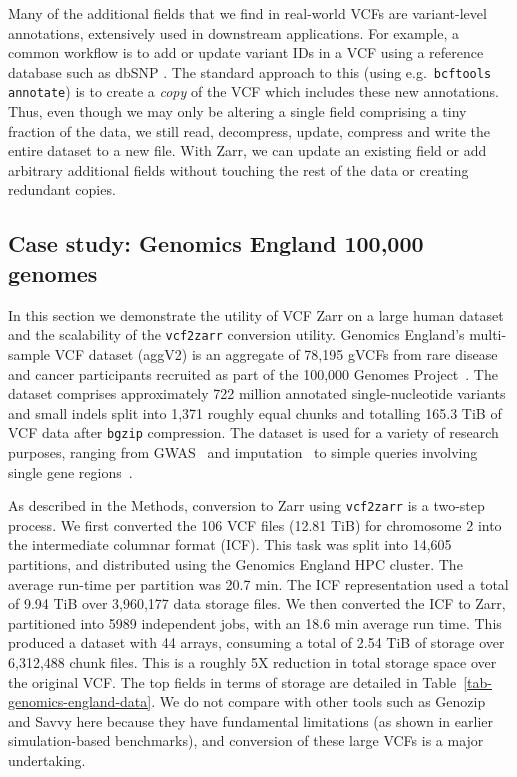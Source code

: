 \documentclass[a4paper,num-refs]{oup-contemporary}
\begin{document}
Many of the additional fields that we find in real-world VCFs are 
variant-level annotations, extensively used in downstream applications.
For example, a common workflow is to 
add or update variant IDs in a VCF using a reference database
such as dbSNP \cite{Sherry2001dbSNP}. The standard approach to this
(using e.g.\ \texttt{bcftools annotate}) is to create a \emph{copy} of 
the VCF which includes these new annotations. Thus, even though 
we may only be altering a single field comprising a tiny fraction 
of the data, we still read, decompress, update, compress and 
write the entire dataset to a new file. With Zarr,
we can update an existing field or add arbitrary additional
fields without touching the rest of the data or creating redundant
copies.

\subsection{Case study: Genomics England 100,000 genomes}
In this section we demonstrate the utility of VCF Zarr on a large human dataset
and the scalability of the \texttt{vcf2zarr} conversion utility.
Genomics England’s multi-sample VCF dataset (aggV2) is an 
aggregate of 78,195 gVCFs from rare disease and cancer participants 
recruited as part of the 100,000 Genomes Project~\cite{turnbull2018100}. 
The dataset comprises approximately 722 million annotated single-nucleotide 
variants and small indels split into 1,371 roughly equal chunks and 
totalling 165.3 TiB of VCF data after \texttt{bgzip} compression. 
The dataset is used for a variety of research purposes, ranging from 
GWAS~\cite{kousathanas2022whole} and 
imputation~\cite{shi2023genomics} to 
simple queries involving single gene 
regions~\cite{leggatt2023genotype,lam2023repeat}.

As described in the Methods, conversion to Zarr using 
\texttt{vcf2zarr} is a two-step process. We 
first converted the 106 VCF files (12.81 TiB) for chromosome 2
into the intermediate columnar format (ICF). This task was 
split into 14,605 partitions, and distributed using the Genomics England
HPC cluster. The average run-time per partition was 20.7 min.
The ICF representation used a total
of 9.94 TiB over 3,960,177 data storage files. 
We then converted the ICF to Zarr, partitioned into
5989 independent jobs, with an 18.6 min average run time.
This produced a dataset with 44 arrays, consuming a 
total of 2.54 TiB of storage over 6,312,488
chunk files. This is a roughly 5X reduction in total storage 
space over the original VCF. 
The top fields in terms 
of storage are detailed in Table~\ref{tab-genomics-england-data}.
We do not compare with other tools such as Genozip and 
Savvy here because  they have fundamental limitations 
(as shown in earlier simulation-based benchmarks),
and conversion of these large VCFs is a major undertaking.
\end{document}
